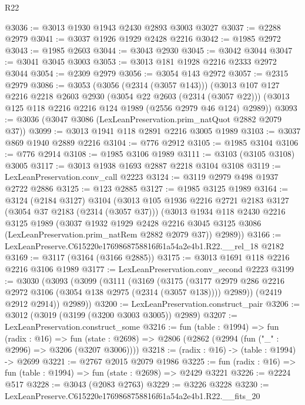 \begin{lexlean}{R22}
\begin{coremodule}
@3036 := @3013 @1930 @1943 @2430 @2893 @3003 @3027
@3037 := @2288 @2979
@3041 := @3037 @1926 @1929 @2428 @2216
@3042 := @1985 @2972
@3043 := @1985 @2603
@3044 := @3043 @2930
@3045 := @3042 @3044
@3047 := @3041 @3045 @3003
@3053 := @3013 @181 @1928 @2216 @2333 @2972 @3044
@3054 := @2309 @2979
@3056 := @3054 @143 @2972
@3057 := @2315 @2979
@3086 := @3053
    (@3056 (@2314 (@3057 @143)))
    (@3013
      @107
      @127
      @2216
      @2218
      @2603
      @2930
      (@3054 @22 @2603 (@2314 (@3057 @22)))
      (@3013 @125 @118 @2216 @2216 @124 @1989 (@2556 @2979 @46 @124) @2989))
@3093 := @3036 (@3047 @3086 (LexLeanPreservation.prim_natQuot @2882 @2079 @37))
@3099 := @3013 @1941 @118 @2891 @2216 @3005 @1989
@3103 := @3037 @869 @1940 @2889 @2216
@3104 := @776 @2912
@3105 := @1985 @3104
@3106 := @776 @2914
@3108 := @1985 @3106 @1989
@3111 := @3103 (@3105 @3108) @3005
@3117 := @3013 @1938 @1693 @2887 @2218 @3104 @3108
@3119 := LexLeanPreservation.conv_call @2223
@3124 := @3119 @2979 @498 @1937 @2722 @2886
@3125 := @123 @2885
@3127 := @1985 @3125 @1989
@3164 := @3124
    (@2184 @3127)
    @3104
    (@3013
      @105
      @1936
      @2216
      @2721
      @2183
      @3127
      (@3054 @37 @2183 (@2314 (@3057 @37)))
      (@3013
        @1934
        @118
        @2430
        @2216
        @3125
        @1989
        (@3037
          @1932
          @1929
          @2428
          @2216
          @3045
          @3125
          @3086
          (LexLeanPreservation.prim_natRem @2882 @2079 @37))
        @2989))
@3166 := LexLeanPreserve.C615220e1769868758816f61a54a2e4b1.R22.__rel_18 @2182
@3169 := @3117 (@3164 (@3166 @2885))
@3175 := @3013 @1691 @118 @2216 @2216 @3106 @1989
@3177 := LexLeanPreservation.conv_second @2223
@3199 := @3030
    (@3093
      (@3099
        (@3111
          (@3169
            (@3175
              (@3177 @2979 @286 @2216 @2972 @3106 (@3054 @138 @2975 (@2314 (@3057 @138))))
              @2989))
          (@2419 @2912 @2914))
        @2989))
@3200 := LexLeanPreservation.construct_pair
@3206 := @3012 (@3019 (@3199 (@3200 @3003 @3005)) @2989)
@3207 := LexLeanPreservation.construct_some
@3216 := fun (table : @1994) =>
  fun (radix : @16) =>
  fun (state : @2698) => @2806 (@2862 (@2994 (fun ("_" : @2996) => @3206 (@3207 @3006))))
@3218 := (radix : @16) -> (table : @1994) -> @2699
@3221 := @2767 @2015 @2079 @1986
@3225 := fun (radix : @16) => fun (table : @1994) => fun (state : @2698) => @2429 @3221
@3226 := @2224 @517
@3228 := @3043 (@2083 @2763)
@3229 := @3226 @3228
@3230 := LexLeanPreserve.C615220e1769868758816f61a54a2e4b1.R22.__fits_20

\end{coremodule}
\end{lexlean}
